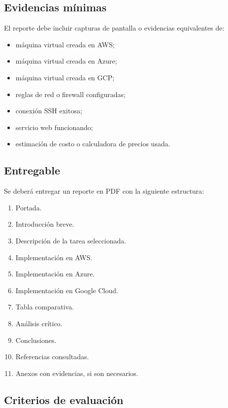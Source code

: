\documentclass[
  coursetitle={Cómputo Nube y Tecnologías Emergentes},
  coursehours={96},
  coursedate={Verano 2026},
  doctype={Tarea 1},
  otherlangs={english,french},
  authorname={Lázaro},
  authorsurname={Bustio-Martínez},
  authortitle={PhD},
  role={Profesor Investigador},
  email={lbustio@inaoe.mx},
  phone={5559504000},
  ext={7459},
  institution={Instituto Nacional de Astrofísica, Óptica y Electrónica (INAOE)},
  department={Maestría en Ciencias en Tecnologías de Seguridad},
  address={Luis Enrique Erro 1, Sta. Ma. Tonantzintla, San Andrés Cholula, CP 72840, Puebla, México},
  margin={0.5in}
]{../../../lbustio_lecture_notes}
\begin{document}
\subsection{Evidencias mínimas}
\label{sec:tarea1-evidencias}

El reporte debe incluir capturas de pantalla o evidencias equivalentes de:

\begin{itemize}
  \item máquina virtual creada en AWS;
  \item máquina virtual creada en Azure;
  \item máquina virtual creada en GCP;
  \item reglas de red o firewall configuradas;
  \item conexión SSH exitosa;
  \item servicio web funcionando;
  \item estimación de costo o calculadora de precios usada.
\end{itemize}

\subsection{Entregable}
\label{sec:tarea1-entregable}

Se deberá entregar un reporte en PDF con la siguiente estructura:

\begin{enumerate}
  \item Portada.
  \item Introducción breve.
  \item Descripción de la tarea seleccionada.
  \item Implementación en AWS.
  \item Implementación en Azure.
  \item Implementación en Google Cloud.
  \item Tabla comparativa.
  \item Análisis crítico.
  \item Conclusiones.
  \item Referencias consultadas.
  \item Anexos con evidencias, si son necesarios.
\end{enumerate}

\subsection{Criterios de evaluación}
\label{sec:tarea1-criterios}
\end{document}
